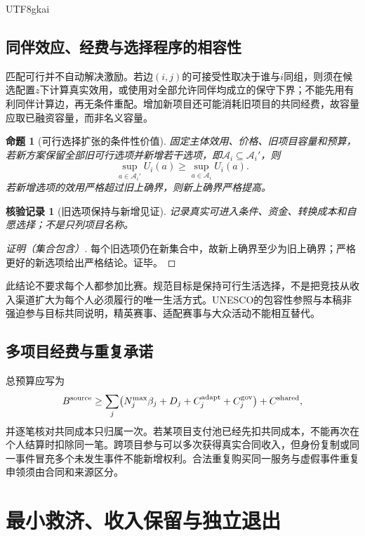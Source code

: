 \documentclass[12pt,a4paper,openany]{report}
\newtheorem{proposition}{命题}[chapter]
\newtheorem{Certificate}{核验记录}[chapter]
\begin{document}
\begin{CJK*}{UTF8}{gkai}
\section{同伴效应、经费与选择程序的相容性}
匹配可行并不自动解决激励。若边$(i,j)$的可接受性取决于谁与$i$同组，则须在候选配置$z$下计算真实效用，或使用对全部允许同伴均成立的保守下界；不能先用有利同伴计算边，再无条件重配。增加新项目还可能消耗旧项目的共同经费，故容量应取已融资容量，而非名义容量。
\begin{proposition}[可行选择扩张的条件性价值]
\label{prop:choice-expansion}
固定主体效用、价格、旧项目容量和预算，若新方案保留全部旧可行选项并新增若干选项，即$\mathcal A_i\subseteq\mathcal A_i'$，则
\[
 \sup_{a\in\mathcal A_i'}U_i(a)\ge\sup_{a\in\mathcal A_i}U_i(a).
\]
若新增选项的效用严格超过旧上确界，则新上确界严格提高。
\end{proposition}
\begin{Certificate}[旧选项保持与新增见证]
记录真实可进入条件、资金、转换成本和自愿选择；不是只列项目名称。
\end{Certificate}
\begin{proof}[证明（集合包含）]
每个旧选项仍在新集合中，故新上确界至少为旧上确界；严格更好的新选项给出严格结论。证毕。
\end{proof}
此结论不要求每个人都参加比赛。规范目标是保持可行生活选择，不是把竞技从收入渠道扩大为每个人必须履行的唯一生活方式。UNESCO的包容性参照与本稿非强迫参与目标共同说明，精英赛事、适配赛事与大众活动不能相互替代\cite{UNESCOCharter}。

\section{多项目经费与重复承诺}
总预算应写为
\[
 B^{\rm source}\ge
 \sum_j\bigl(N_j^{\max}\beta_j+D_j+C_j^{\rm adapt}+C_j^{\rm gov}\bigr)
 +C^{\rm shared},
\]
并逐笔核对共同成本只归属一次。若某项目支付池已经先扣共同成本，不能再次在个人结算时扣除同一笔。跨项目参与可以多次获得真实合同收入，但身份复制或同一事件冒充多个未发生事件不能新增权利。合法重复购买同一服务与虚假事件重复申领须由合同和来源区分。

\chapter{最小救济、收入保留与独立退出}
\label{chap:relief}

\end{CJK*}
\end{document}
